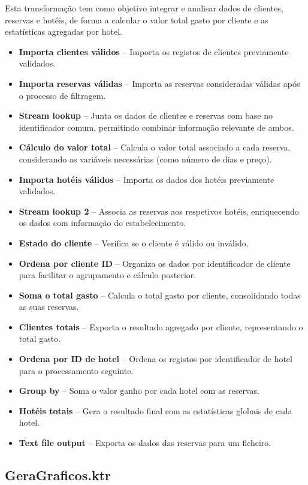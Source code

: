 \documentclass[a4paper, 12pt]{article} %
\begin{document}
Esta transformação tem como objetivo integrar e analisar dados de clientes, reservas e hotéis, de forma a calcular o valor total gasto por cliente e as estatísticas agregadas por hotel.

\begin{itemize}
	\item \textbf{Importa clientes válidos} – Importa os registos de clientes previamente validados.
	\item \textbf{Importa reservas válidas} – Importa as reservas consideradas válidas após o processo de filtragem.
	\item \textbf{Stream lookup} – Junta os dados de clientes e reservas com base no identificador comum, permitindo combinar informação relevante de ambos.
	\item \textbf{Cálculo do valor total} – Calcula o valor total associado a cada reserva, considerando as variáveis necessárias (como número de dias e preço).
	\item \textbf{Importa hotéis válidos} – Importa os dados dos hotéis previamente validados.
	\item \textbf{Stream lookup 2} – Associa as reservas aos respetivos hotéis, enriquecendo os dados com informação do estabelecimento.
	\item \textbf{Estado do cliente} – Verifica se o cliente é válido ou inválido.
	\item \textbf{Ordena por cliente ID} – Organiza os dados por identificador de cliente para facilitar o agrupamento e cálculo posterior.
	\item \textbf{Soma o total gasto} – Calcula o total gasto por cliente, consolidando todas as suas reservas.
	\item \textbf{Clientes totais} – Exporta o resultado agregado por cliente, representando o total gasto.
	\item \textbf{Ordena por ID de hotel} – Ordena os registos por identificador de hotel para o processamento seguinte.
	\item \textbf{Group by} – Soma o valor ganho por cada hotel com as reservas.
	\item \textbf{Hotéis totais} – Gera o resultado final com as estatísticas globais de cada hotel.
	\item \textbf{Text file output} – Exporta os dados das reservas para um ficheiro.
\end{itemize}

\subsection{GeraGraficos.ktr}
\end{document}
